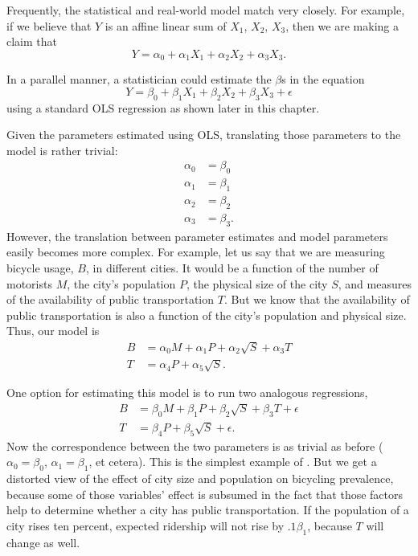 
Frequently, the statistical and real-world model match very closely.
For example, if we believe that $Y$ is an affine linear sum of $X_1$,
$X_2$, $X_3$, then we are making a claim that 
\begin{equation*}
Y = \alpha_0 + \alpha_1 X_1 + \alpha_2 X_2 + \alpha_3 X_3.
\end{equation*}

In a parallel manner, a statistician could estimate the $\beta$s in the equation
\begin{equation*}
Y = \beta_0 + \beta_1 X_1 + \beta_2 X_2 + \beta_3 X_3 + \epsilon
\end{equation*}
using a standard OLS regression as shown later in this chapter.

Given the parameters estimated using OLS, translating those parameters
to the model is rather trivial:
\begin{align*}
\alpha_0 &= \beta_0\\
\alpha_1 &= \beta_1\\
\alpha_2 &= \beta_2\\
\alpha_3 &= \beta_3.
\end{align*}
However, the translation between parameter estimates and model
parameters easily becomes more complex.  For example, let us say that
we are measuring bicycle usage, $B$, in different  cities.  It would be
a function of the number of motorists $M$, the city's population $P$,
the physical size of the city $S$,  and measures of the availability of
public transportation $T$. But we know that the availability of public
transportation is also a function of the city's population and physical
size. Thus, our model is
\begin{align*}
B &= \alpha_0 M + \alpha_1 P + \alpha_2 \sqrt{S} + \alpha_3 T\\
T &= \alpha_4 P + \alpha_5 \sqrt{S}.
\end{align*}

One option for estimating this model is to run two analogous regressions,
\begin{align*}
B &= \beta_0 M + \beta_1 P + \beta_2 \sqrt{S} + \beta_3 T + \epsilon\\
T &= \beta_4 P + \beta_5 \sqrt{S} + \epsilon.
\end{align*}
Now the correspondence between the two parameters is as trivial as
before ($\alpha_0=\beta_0$, $\alpha_1=\beta_1$, et cetera). This is the
simplest example of .
But we get a
distorted view of the effect of city size and population on bicycling
prevalence, because some of those variables' effect is subsumed in the fact that
those factors help to determine whether a city has public
transportation. If the population of a city rises ten percent, expected ridership
will not rise by $.1 \beta_1$, because $T$ will change as well.

